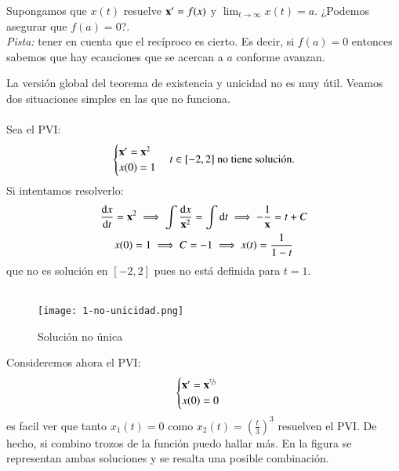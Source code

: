 \begin{th_ex}
    Supongamos que $x(t)$ resuelve $\mathbf{x'} = f(x)$ y $\lim_{t \to \infty} x(t) = a$. ¿Podemos asegurar que $f(a) = 0$?.\\ \textit{Pista:} tener en cuenta que el recíproco es cierto. Es decir, si $f(a) = 0$ entonces sabemos que hay ecauciones que se acercan a $a$ conforme avanzan.
\end{th_ex}
La versión global del teorema de existencia y unicidad no es muy útil. Veamos dos situaciones simples en las que no funciona.\\\\
Sea el PVI:
$$
    \begin{cases}
        \mathbf{x'} = \mathbf{x}^2\\
        x(0)=1
    \end{cases} t\in [-2,2] \text{ no tiene solución.} \label{eg:no-solution}
$$
Si intentamos resolverlo:
\begin{gather*}
    \frac{\mathrm{d}x}{\mathrm{d}t} = \mathbf{x}^2 \implies \int \frac{\mathrm{d} x}{\mathbf{x}^2} = \int \mathrm{d} t \implies -\frac{1}{\mathbf{x}} = t + C\\
    x(0) = 1 \implies C = -1 \implies x(t) = \frac{1}{1-t}
\end{gather*}
que no es solución en $[-2,2]$ pues no está definida para $t=1$.\\\\

\begin{wrapfigure}[12]{r}{0.6\textwidth}
  \begin{center}
    \texttt{[image: 1-no-unicidad.png]}
  \end{center}
  \caption{Solución no única}\label{img:1-no-unicidad}
\end{wrapfigure}
Consideremos ahora el PVI:
$$
    \begin{cases}
        \mathbf{x'} = \mathbf{x}^{\sfrac{2}{3}}\\
        x(0)=0
    \end{cases}
$$
es facil ver que tanto $x_1(t) = 0$ como $x_2(t)=(\frac{t}{3})^3$ resuelven el PVI. De hecho, si combino trozos de la función puedo hallar más. En la figura se representan ambas soluciones y se resalta una posible combinación.\\\\

